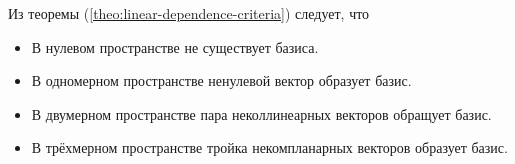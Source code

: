 \documentclass[a4paper,12pt]{article}
\begin{document}
  Из теоремы (\ref{theo:linear-dependence-criteria}) следует, что
  \begin{itemize}
    \item В нулевом пространстве не существует базиса.
    \item В одномерном пространстве ненулевой вектор образует базис.
    \item В двумерном пространстве пара неколлинеарных векторов обращует базис.
    \item В трёхмерном пространстве тройка некомпланарных векторов образует базис.
  \end{itemize}
  \begin{problem}[1.6]
  
  \end{problem}
  
  \begin{solution}
  
  \end{solution}
  

  \begin{problem}[1.11(1)]
  
  \end{problem}
  
  \begin{solution}
  
  \end{solution}
  
  
  \begin{problem}[1.24(1)]
  
  \end{problem}
  
  \begin{solution}
  
  \end{solution}
  
  
  \begin{problem}[1.51]
  
  \end{problem}
  
  \begin{solution}
  
  \end{solution}
  
  
  \begin{problem}[1.39]
  
  \end{problem}
  
  \begin{solution}
  
  \end{solution}
  
\end{document}
